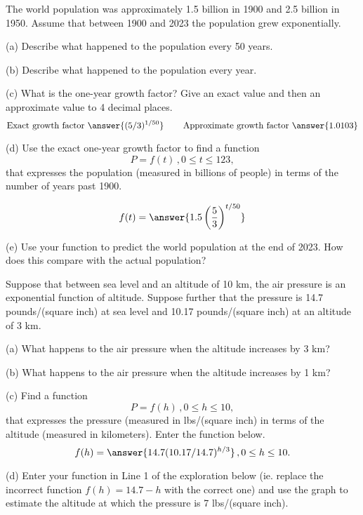 \documentclass{ximera}
\begin{document}
\begin{question}   \label{Q6:ExponentialG}
The world population was approximately 1.5 billion in 1900 and 2.5 billion in 1950. Assume that between 1900 and 2023 the population grew exponentially.

(a) Describe what happened to the population every 50 years.

(b) Describe what happened to the population every year.

(c) What is the one-year growth factor? Give an exact value and then an approximate value to 4 decimal places.
\[
   \text{Exact growth factor }  \answer{(5/3)^{1/50}} \hskip 0.3 in  \text{Approximate growth factor } \answer{1.0103}
\]

(d) Use the exact one-year growth factor to find a function
\[
     P = f(t) \, , 0\leq t \leq 123 ,
\]
that expresses the population (measured in billions of people) in terms of the number of years past 1900.

\[
   f(t) = \answer{1.5 \left(\frac{5}{3}\right)^{t/50}}
\]

(e) Use your function to predict the world population at the end of 2023. How does this compare with the actual population?

\end{question}


\begin{question}   \label{Q88:ExponentialG}
Suppose that between sea level and an altitude of 10 km, the air pressure is an exponential function of altitude. Suppose further that the pressure is 14.7 pounds/(square inch) at sea level and 10.17 pounds/(square inch) at an altitude of 3 km.

(a) What happens to the air pressure when the altitude increases by 3 km?

(b) What happens to the air pressure when the altitude increases by 1 km?

(c) Find a function
\[
    P = f(h) \, , 0\leq h \leq 10,
\]
that expresses the pressure (measured in lbs/(square inch) in terms of the altitude (measured in kilometers). Enter the function below.
\[
      f(h) = \answer{14.7(10.17/14.7)^{h/3}} \, , 0\leq h \leq 10 .
\]

(d) Enter your function in Line 1 of the exploration below (ie. replace the incorrect function $f(h)=14.7-h$ with the correct one) and use the graph to estimate the altitude at which the pressure is 7 lbs/(square inch).


 
\begin{onlineOnly}
    \begin{center}
\end{center}
\end{onlineOnly}

\end{question}
\end{document}
